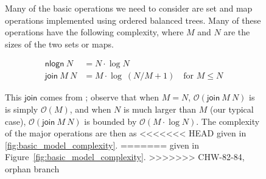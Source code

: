 \documentclass{article}
\newcommand{\order}[1]{\mathcal{O}\left(#1\right)}
\theoremstyle{definition}{
  \newtheorem{lemma}{Lemma}[section] %
  \newtheorem{definition}[lemma]{Definition}
}
\theoremstyle{theorem}{
  \newtheorem{invariant}[lemma]{Invariant}
  \newtheorem{proofobligation}[lemma]{Proof Obligation}
}
\numberwithin{equation}{lemma}
\begin{document}
\begin{figure}
Many of the basic operations we need to consider are set and map operations
implemented using ordered balanced trees. Many of these operations have the
following complexity, where $M$ and $N$ are the sizes of the two sets or maps.

\begin{equation*}
\begin{split}
\mathsf{nlogn} ~ N & = N \cdot \log N \\
\mathsf{join} ~ M ~ N & = M \cdot \log ~ (N/M + 1) \quad \text{for } M \leq N
\end{split}
\end{equation*}

This $\mathsf{join}$ comes from \cite{join_bound}; observe that when $M = N$,
$\order{\mathsf{join} ~ M ~ N}$ is is simply $\order{M}$, and when $N$ is much
larger than $M$ (our typical case), $\order{\mathsf{join} ~ M ~ N}$ is bounded
by $\order{M \cdot \log N}$. The complexity of the major operations are then as
<<<<<<< HEAD
given in \cref{fig:basic_model_complexity}.
=======
given in Figure~\ref{fig:basic_model_complexity}.
>>>>>>> CHW-82-84, orphan branch


\end{figure}
\end{document}
